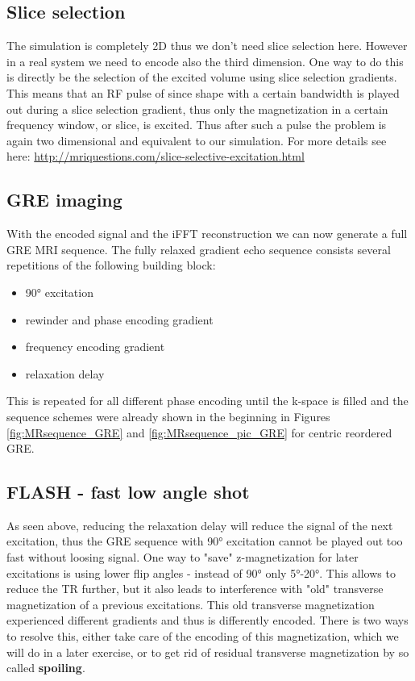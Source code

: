 \documentclass[a4paper,12pt]{extarticle}
\begin{document}
\subsection{Slice selection}
The simulation is completely 2D thus we don't need slice selection here. However in a real system we need to encode also the third dimension. One way to do this is directly be the selection of the excited volume using slice selection gradients. This means that an RF pulse of since shape with a certain bandwidth is played out during a slice selection gradient, thus only the magnetization in a certain frequency window, or slice, is excited. Thus after such a pulse the problem is again two dimensional and equivalent to our simulation. For more details see here: \href{http://mriquestions.com/slice-selective-excitation.html}{http://mriquestions.com/slice-selective-excitation.html}

\subsection{GRE imaging}
With the encoded signal and the iFFT reconstruction we can now generate a full GRE MRI sequence. The fully relaxed gradient echo sequence consists several repetitions of the following building block: 
\begin{itemize}
\item 90° excitation
\item rewinder and phase encoding gradient 
\end{itemize}
\begin{itemize}
\item frequency encoding gradient
\item relaxation delay
\end{itemize}
This is repeated for all different phase encoding until the k-space is filled and the sequence schemes were already shown in the beginning in Figures \ref{fig:MRsequence_GRE} and \ref{fig:MRsequence_pic_GRE} for centric reordered GRE.

\subsection{FLASH - fast low angle shot}
As seen above, reducing the relaxation delay will reduce the signal of the next excitation, thus the GRE sequence with 90° excitation cannot be played out too fast without loosing signal. One way to "save" z-magnetization for later excitations is using lower flip angles - instead of 90° only 5°-20°. This allows to reduce the TR further, but it also leads to interference with "old" transverse magnetization of a previous excitations. This old transverse magnetization experienced different gradients and thus is differently encoded. There is two ways to resolve this, either take care of the encoding of this magnetization, which we will do in a later exercise, or to get rid of residual transverse magnetization by so called \textbf{spoiling}.
\end{document}
